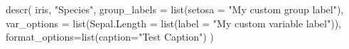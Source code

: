 \documentclass[
]{article}
\newenvironment{Shaded}{\begin{snugshade}}{\end{snugshade}}
\newcommand{\AttributeTok}[1]{\textcolor[rgb]{0.77,0.63,0.00}{#1}}
\newcommand{\FunctionTok}[1]{\textcolor[rgb]{0.00,0.00,0.00}{#1}}
\newcommand{\NormalTok}[1]{#1}
\newcommand{\StringTok}[1]{\textcolor[rgb]{0.31,0.60,0.02}{#1}}
\begin{document}
\begin{Shaded}
\begin{Highlighting}[]
\FunctionTok{descr}\NormalTok{(}
\NormalTok{  iris,}
  \StringTok{"Species"}\NormalTok{,}
  \AttributeTok{group\_labels =} \FunctionTok{list}\NormalTok{(}\AttributeTok{setosa =} \StringTok{"My custom group label"}\NormalTok{),}
  \AttributeTok{var\_options =} \FunctionTok{list}\NormalTok{(}\AttributeTok{Sepal.Length =} \FunctionTok{list}\NormalTok{(}\AttributeTok{label =} \StringTok{"My custom variable label"}\NormalTok{)),}
  \AttributeTok{format\_options=}\FunctionTok{list}\NormalTok{(}\AttributeTok{caption=}\StringTok{"Test Caption"}\NormalTok{)}
\NormalTok{)}
\end{Highlighting}
\end{Shaded}

\needspace{2cm}
\end{document}
